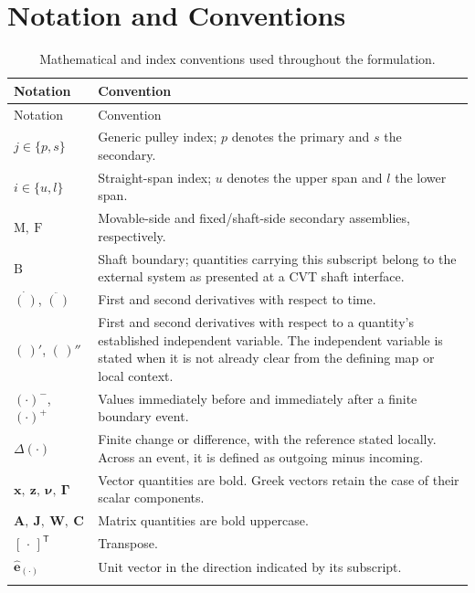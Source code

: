 \documentclass[11pt]{report}
\makeatletter
\numberwithin{equation}{section}
\newcommand{\labelcurrentlongtable}[1]{%
  \edef\@currentlabel{\p@table\thetable}%
  \edef\cref@currentlabel{[table][\arabic{table}][\arabic{chapter}]\thetable}%
  \edef\@currentHref{table.\theHtable}%
  \label{#1}%
}
\newcommand{\vect}[1]{\bm{#1}}
\makeatother
\begin{document}
\section*{Notation and Conventions}

\begin{center}
\small
\setlength{\LTleft}{0pt}
\setlength{\LTright}{0pt}
\begin{longtable}{@{}p{}p{}@{}}
\toprule
Notation & Convention \\ \midrule
\endfirsthead
\toprule
Notation & Convention \\ \midrule
\endhead
\bottomrule
\endfoot
\endlastfoot

$ j\in\{p,s\} $ & Generic pulley index; $p$ denotes the primary and $s$ the secondary. \\
$ i\in\{u,l\} $ & Straight-span index; $u$ denotes the upper span and $l$ the lower span. \\
$\mathrm{M},\ \mathrm{F}$ & Movable-side and fixed/shaft-side secondary assemblies, respectively. \\
$\mathrm{B}$ & Shaft boundary; quantities carrying this subscript belong to the external system as presented at a CVT shaft interface. \\
\addlinespace
$\dot{(\,)}$, $\ddot{(\,)}$ & First and second derivatives with respect to time. \\
$(\,)'$, $(\,)''$ & First and second derivatives with respect to a quantity's established independent variable. The independent variable is stated when it is not already clear from the defining map or local context. \\
$({\cdot})^-$, $({\cdot})^+$ & Values immediately before and immediately after a finite boundary event. \\
$\Delta({\cdot})$ & Finite change or difference, with the reference stated locally. Across an event, it is defined as outgoing minus incoming. \\
\addlinespace
$\vect{x},\ \mathbf z,\ \boldsymbol{\nu},\ \boldsymbol{\Gamma}$ & Vector quantities are bold. Greek vectors retain the case of their scalar components. \\
$\mathbf A,\ \mathbf J,\ \mathbf W,\ \mathbf C$ & Matrix quantities are bold uppercase. \\
$[\,\cdot\,]^{\mathsf T}$ & Transpose. \\
$\hat{\mathbf e}_{(\cdot)}$ & Unit vector in the direction indicated by its subscript. \\

\bottomrule
\caption{Mathematical and index conventions used throughout the formulation.}
\end{longtable}
\labelcurrentlongtable{tab:notation_conventions}
\normalsize
\end{center}
\end{document}
